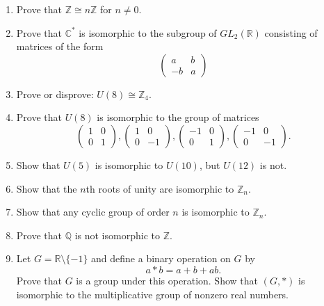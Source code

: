 {\small
\begin{enumerate}
 
 
\item
Prove that ${\mathbb Z} \cong n{\mathbb Z}$ for $n \neq 0$.
 

\item
Prove that ${\mathbb C}^\ast$ is isomorphic to the subgroup of $GL_2(
{\mathbb R} )$ consisting of matrices of the form 
\[
\begin{pmatrix}
a & b \\
-b & a
\end{pmatrix}
\]
 

\item
Prove or disprove: $U(8) \cong {\mathbb Z}_4$.
 

\item
Prove that $U(8)$ is isomorphic to the group of matrices
\[
\begin{pmatrix}
1 & 0 \\
0 & 1
\end{pmatrix},
\begin{pmatrix}
1 & 0 \\
0 & -1
\end{pmatrix},
\begin{pmatrix}
-1 & 0 \\
0 & 1
\end{pmatrix},
\begin{pmatrix}
-1 & 0 \\
0 & -1
\end{pmatrix}.
\]
 

\item
Show that $U(5)$ is isomorphic to $U(10)$, but $U(12)$ is not.
 

\item
Show that the $n$th roots of unity are isomorphic to ${\mathbb Z}_n$. 
 

\item 
Show that any cyclic group of order $n$ is isomorphic to ${\mathbb Z}_n$. 
 

\item
Prove that ${\mathbb Q}$ is not isomorphic to ${\mathbb Z}$.
 

\item
Let $G = {\mathbb R} \setminus \{ -1 \}$ and define a binary operation on
$G$ by 
\[
a \ast b = a + b + ab.
\]
Prove that $G$ is a group under this operation. Show that $(G, *)$ is
isomorphic to the multiplicative group of nonzero real numbers.
 


\end{enumerate}}

